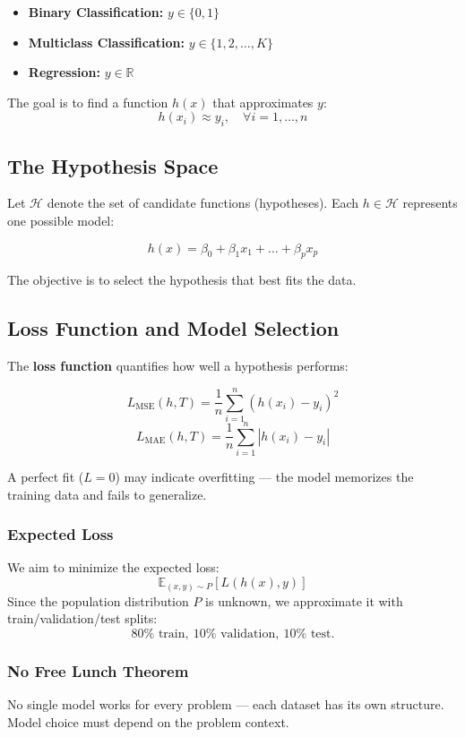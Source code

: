 \begin{itemize}
    \item \textbf{Binary Classification:} $y \in \{0,1\}$
    \item \textbf{Multiclass Classification:} $y \in \{1, 2, \dots, K\}$
    \item \textbf{Regression:} $y \in \mathbb{R}$
\end{itemize}

The goal is to find a function $h(x)$ that approximates $y$:
\[
h(x_i) \approx y_i, \quad \forall i = 1, \dots, n
\]

\subsection{The Hypothesis Space}

Let $\mathcal{H}$ denote the set of candidate functions (hypotheses). Each $h \in \mathcal{H}$ represents one possible model:

\[
h(x) = \beta_0 + \beta_1 x_1 + \dots + \beta_p x_p
\]

The objective is to select the hypothesis that best fits the data.

\subsection{Loss Function and Model Selection}

The \textbf{loss function} quantifies how well a hypothesis performs:

\[
L_{\text{MSE}}(h, T) = \frac{1}{n}\sum_{i=1}^{n}(h(x_i) - y_i)^2
\]
\[
L_{\text{MAE}}(h, T) = \frac{1}{n}\sum_{i=1}^{n}|h(x_i) - y_i|
\]

A perfect fit ($L=0$) may indicate overfitting — the model memorizes the training data and fails to generalize.

\subsubsection{Expected Loss}

We aim to minimize the expected loss:
\[
\mathbb{E}_{(x,y)\sim P}[L(h(x), y)]
\]
Since the population distribution $P$ is unknown, we approximate it with train/validation/test splits:
\[
80\% \text{ train}, \ 10\% \text{ validation}, \ 10\% \text{ test.}
\]

\subsubsection{No Free Lunch Theorem}
No single model works for every problem — each dataset has its own structure. Model choice must depend on the problem context.


